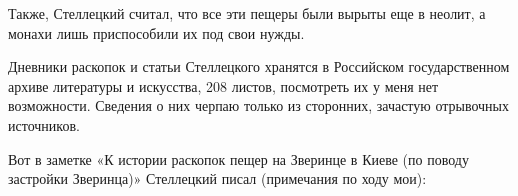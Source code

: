Также, Стеллецкий считал, что все эти пещеры были вырыты еще в неолит, а монахи лишь приспособили их под свои нужды.

Дневники раскопок и статьи Стеллецкого хранятся в Российском государственном архиве литературы и искусства, 208 листов, посмотреть их у меня нет возможности. Сведения о них черпаю только из сторонних, зачастую отрывочных источников.



Вот в заметке «К истории раскопок пещер
на Зверинце в Киеве (по поводу застройки Зверинца)» Стеллецкий писал (примечания по ходу мои):

